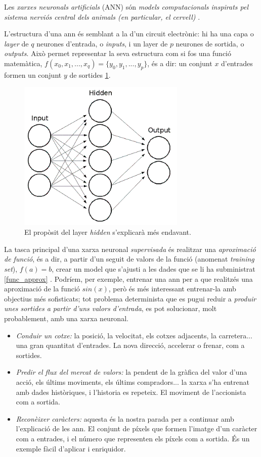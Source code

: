 Les \emph{xarxes neuronals artificials} (ANN) són \emph{models computacionals 
inspirats pel sistema nerviós central dels animals (en particular, el cervell)} \autocite{nnpatrec}.

L'estructura d'una \ac{ann} és semblant a la d'un circuit electrònic: hi ha una capa o \emph{layer}
de $ q $ neurones d'entrada, o \emph{inputs}, i un layer de $ p $ neurones de sortida, o \emph{outputs}.
Això permet representar la seva estructura com si fos una funció matemàtica, $ f(x_0, x_1, ..., x_q) = \{y_0, y_1, ..., y_p\} $,
és a dir: un conjunt $ x $ d'entrades formen un conjunt $ y $ de sortides \ref{simple_ann}.

\begin{figure}[ht!]
\centering
\includegraphics[width=80mm]{data/nn_simple.png}
\caption{El propòsit del layer \emph{hidden} s'explicarà més endavant.}
\label{simple_ann}
\end{figure}

La tasca principal d'una xarxa neuronal \emph{supervisada} és realitzar una \emph{aproximació de funció},
és a dir, a partir d'un seguit de valors de la funció (anomenat \emph{training set}), $ f(a) = b $, crear un model que s'ajusti a les dades
que se li ha subministrat \ref{func_approx} \autocite{msccsanad}. Podríem, per exemple, entrenar una \ac{ann} per a que realitzés
una aproximació de la funció $ sin(x)$, però és més interessant entrenar-la amb objectius més sofisticats; tot
problema determinista que es pugui reduir a \emph{produir unes sortides a partir d'uns valors d'entrada}, es pot
solucionar, molt probablement, amb una xarxa neuronal.

\begin{itemize}
\item \emph{Conduir un cotxe:} la posició, la velocitat, els cotxes adjacents, la carretera... una gran quantitat d'entrades. La nova direcció, 
accelerar o frenar, com a sortides.
\item \emph{Predir el flux del mercat de valors:} la pendent de la gràfica del valor d'una acció, els últims moviments, els últims compradors...
la xarxa s'ha entrenat amb dades històriques, i l'historia es repeteix. El moviment de l'accionista com a sortida.
\item \emph{Reconèixer caràcters:} aquesta és la nostra parada per a continuar amb l'explicació de les \ac{ann}. El conjunt de píxels que formen 
l'imatge d'un caràcter com a entrades, i el número que representen els píxels com a sortida. És un exemple fàcil d'aplicar i enriquidor.
\end{itemize}

